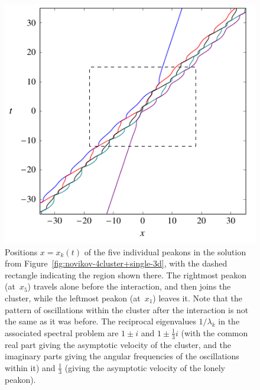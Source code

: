 \documentclass[10pt,a4paper]{article} \pdfoutput=1 
\begin{document}
\begin{figure}
  \centering \includegraphics[width=1.0\linewidth]{graphics/novikov-4cluster+single.pdf}
  \caption{Positions $x = x_k(t)$ of the five individual peakons in the solution
    from Figure~\ref{fig:novikov-4cluster+single-3d}, with the dashed rectangle
    indicating the region shown there.
    The rightmost peakon (at~$x_5$) travels alone before the interaction,
    and then joins the cluster, while the leftmost peakon (at~$x_1$) leaves it.
    Note that the pattern of oscillations within the cluster after the interaction
    is not the same as it was before.
    The reciprocal eigenvalues $1/\lambda_k$ in the associated spectral problem
    are $1 \pm i$ and $1 \pm \tfrac13 i$ (with the common real part giving the
    asymptotic velocity of the cluster, and the imaginary parts giving the
    angular frequencies of the oscillations within it)
    and $\tfrac13$ (giving the asymptotic velocity of the lonely peakon).
  }
  \label{fig:novikov-4cluster+single}
\end{figure}
\end{document}
